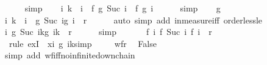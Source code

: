 \begin{isabellebody}
\ \ \ \ \isamarkupfalse%
\ simp\isanewline
\ \ \isamarkupfalse%
\ {\isachardoublequoteopen}{\isasymforall}i{\isachardot}\ k\ {\isasymle}\ i\ {\isasymlongrightarrow}\ f\ {\isacharparenleft}g\ {\isacharparenleft}Suc\ i{\isacharparenright}{\isacharparenright}\ {\isacharequal}\ f\ {\isacharparenleft}g\ i{\isacharparenright}{\isachardoublequoteclose}\isanewline
\ \ \ \ \isamarkupfalse%
\ simp\isanewline
\ \ \isamarkupfalse%
\ g\ \isamarkupfalse%
\ {\isachardoublequoteopen}{\isasymforall}i{\isachardot}\ k\ {\isasymle}\ i\ {\isasymlongrightarrow}\ {\isacharparenleft}g\ {\isacharparenleft}Suc\ i{\isacharparenright}{\isacharcomma}{\isacharparenleft}g\ i{\isacharparenright}{\isacharparenright}\ {\isasymin}\ r{\isachardoublequoteclose}\isanewline
\ \ \ \ \isamarkupfalse%
\ {\isacharparenleft}auto\ simp\ add{\isacharcolon}\ in{\isacharunderscore}measure{\isacharunderscore}iff\ order{\isacharunderscore}less{\isacharunderscore}le\ {\isacharparenright}\isanewline
\ \ \isamarkupfalse%
\ {\isachardoublequoteopen}{\isasymforall}i{\isachardot}\ {\isacharparenleft}g\ {\isacharparenleft}Suc\ {\isacharparenleft}i{\isacharplus}k{\isacharparenright}{\isacharparenright}{\isacharcomma}{\isacharparenleft}g\ {\isacharparenleft}i{\isacharplus}k{\isacharparenright}{\isacharparenright}{\isacharparenright}\ {\isasymin}\ r{\isachardoublequoteclose}\isanewline
\ \ \ \ \isamarkupfalse%
\ simp\isanewline
\ \ \isamarkupfalse%
\isanewline
\ \ \isamarkupfalse%
\ {\isachardoublequoteopen}{\isasymexists}f{\isachardot}\ {\isasymforall}i{\isachardot}\ {\isacharparenleft}f\ {\isacharparenleft}Suc\ i{\isacharparenright}{\isacharcomma}\ f\ i{\isacharparenright}\ {\isasymin}\ r{\isachardoublequoteclose}\isanewline
\ \ \ \ \isamarkupfalse%
\ {\isacharminus}\ {\isacharparenleft}rule\ exI\ {\isacharbrackleft}\ x{\isacharequal}{\isachardoublequoteopen}{\isasymlambda}i{\isachardot}\ g\ {\isacharparenleft}i{\isacharplus}k{\isacharparenright}{\isachardoublequoteclose}{\isacharbrackright}{\isacharcomma}simp{\isacharparenright}\ \isanewline
\ \ \isamarkupfalse%
\ wf{\isacharunderscore}r\ \isamarkupfalse%
\ False\isanewline
\ \ \ \ \isamarkupfalse%
\ {\isacharparenleft}simp\ add{\isacharcolon}\ wf{\isacharunderscore}iff{\isacharunderscore}no{\isacharunderscore}infinite{\isacharunderscore}down{\isacharunderscore}chain{\isacharparenright}\isanewline
{}\isamarkupfalse%

\end{isabellebody}
